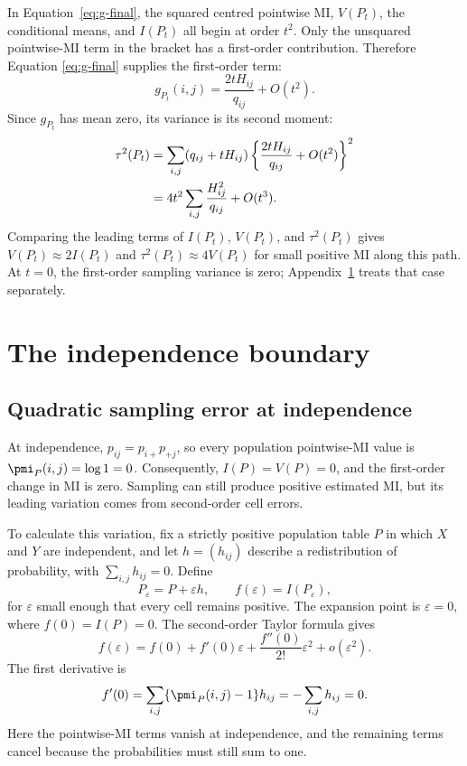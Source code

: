 In Equation~\eqref{eq:g-final}, the squared centred pointwise MI,
\(V(P_t)\), the conditional means, and \(I(P_t)\) all begin at order
\(t^2\). Only the unsquared pointwise-MI term in the bracket has a
first-order contribution. Therefore Equation
\eqref{eq:g-final} supplies the first-order term:
\begin{equation}
 g_{P_t}(i,j)=\frac{2tH_{ij}}{q_{ij}}+O(t^2).
\end{equation}
Since \(g_{P_t}\) has mean zero, its variance is its second moment:
\begin{align}
 \tau^2(P_t)
 &=\sum_{i,j}(q_{ij}+tH_{ij})
   \left\{\frac{2tH_{ij}}{q_{ij}}+O(t^2)\right\}^2\notag\\*
 &=4t^2\sum_{i,j}\frac{H_{ij}^2}{q_{ij}}+O(t^3).
\end{align}
Comparing the leading terms of \(I(P_t)\), \(V(P_t)\), and \(\tau^2(P_t)\)
gives \(V(P_t)\approx2I(P_t)\) and
\(\tau^2(P_t)\approx4V(P_t)\) for small positive MI along this path.
At \(t=0\), the first-order sampling variance is zero;
Appendix~\ref{sec:independence-boundary} treats that case separately.

\section{The independence boundary}
\label{sec:independence-boundary}

\subsection{Quadratic sampling error at independence}

At independence, \(p_{ij}=p_{i+}p_{+j}\), so every population
pointwise-MI value is \(\pmi_P(i,j)=\log 1=0\). Consequently,
\(I(P)=V(P)=0\), and the first-order change in MI is zero. Sampling can
still produce positive estimated MI, but its leading variation comes from
second-order cell errors.

To calculate this variation, fix a strictly positive population table
\(P\) in which \(X\) and \(Y\) are independent, and let \(h=(h_{ij})\)
describe a redistribution of probability,
with \(\sum_{i,j}h_{ij}=0\). Define
\begin{equation}
 P_\varepsilon=P+\varepsilon h,
 \qquad f(\varepsilon)=I(P_\varepsilon),
\end{equation}
for \(\varepsilon\) small enough that every cell remains positive.
The expansion point is \(\varepsilon=0\), where \(f(0)=I(P)=0\).
The second-order Taylor formula gives
\begin{equation}
 f(\varepsilon)
 =f(0)+f'(0)\varepsilon+\frac{f''(0)}{2!}\varepsilon^2
  +o(\varepsilon^2).
\end{equation}
The first derivative is
\begin{equation}
 f'(0)=\sum_{i,j}\{\pmi_P(i,j)-1\}h_{ij}
       =-\sum_{i,j}h_{ij}=0.
\end{equation}
Here the pointwise-MI terms vanish at independence, and the remaining
terms cancel because the probabilities must still sum to one.

